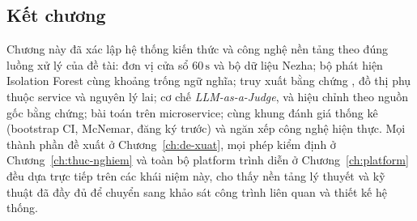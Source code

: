 \subsection{Kết chương}
\label{sec:ch2-ket-chuong}

Chương này đã xác lập hệ thống kiến thức và công nghệ nền tảng theo đúng luồng xử lý của đề tài: đơn vị cửa sổ $60\,\text{s}$ và bộ dữ liệu Nezha; bộ phát hiện Isolation Forest cùng khoảng trống ngữ nghĩa; truy xuất bằng chứng , đồ thị phụ thuộc service và nguyên lý  lai; cơ chế \emph{LLM-as-a-Judge},  và hiệu chỉnh theo nguồn gốc bằng chứng; bài toán  trên microservice; cùng khung đánh giá thống kê (bootstrap CI, McNemar, đăng ký trước) và ngăn xếp công nghệ hiện thực. Mọi thành phần đề xuất ở Chương~\ref{ch:de-xuat}, mọi phép kiểm định ở Chương~\ref{ch:thuc-nghiem} và toàn bộ platform trình diễn ở Chương~\ref{ch:platform} đều dựa trực tiếp trên các khái niệm này, cho thấy nền tảng lý thuyết và kỹ thuật đã đầy đủ để chuyển sang khảo sát công trình liên quan và thiết kế hệ thống.
